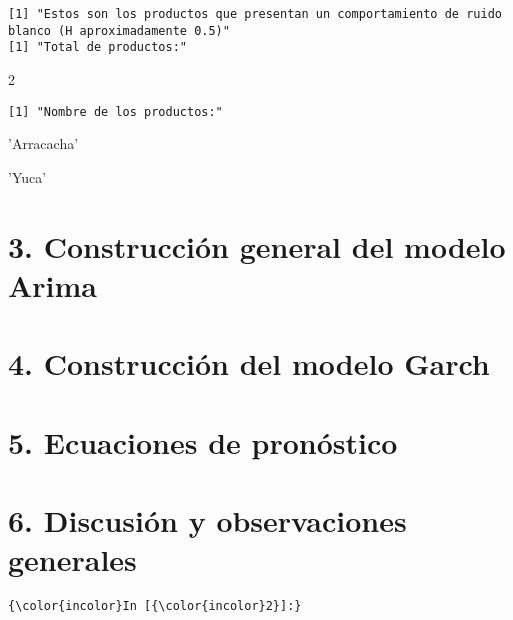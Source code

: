 \documentclass[11pt]{article}
\begin{document}
    \begin{Verbatim}[commandchars=\\\{\}]
[1] "Estos son los productos que presentan un comportamiento de ruido blanco (H aproximadamente 0.5)"
[1] "Total de productos:"

    \end{Verbatim}

    2

    
    \begin{Verbatim}[commandchars=\\\{\}]
[1] "Nombre de los productos:"

    \end{Verbatim}

    \begin{enumerate*}
\item 'Arracacha'
\item 'Yuca'
\end{enumerate*}


    
    \hypertarget{construcciuxf3n-general-del-modelo-arima}{%
\section{ 3. Construcción general del modelo
Arima}\label{construcciuxf3n-general-del-modelo-arima}}

    \hypertarget{construcciuxf3n-del-modelo-garch}{%
\section{ 4. Construcción del modelo
Garch}\label{construcciuxf3n-del-modelo-garch}}

    \hypertarget{ecuaciones-de-pronuxf3stico}{%
\section{ 5. Ecuaciones de
pronóstico}\label{ecuaciones-de-pronuxf3stico}}

    \hypertarget{discusiuxf3n-y-observaciones-generales}{%
\section{ 6. Discusión y observaciones
generales}\label{discusiuxf3n-y-observaciones-generales}}

    \begin{Verbatim}[commandchars=\\\{\}]
{\color{incolor}In [{\color{incolor}2}]:} 
\end{Verbatim}
\end{document}
